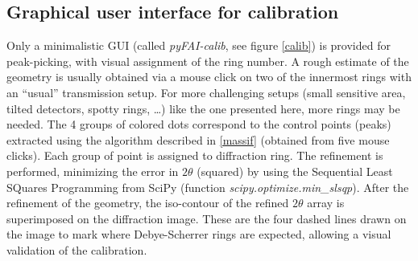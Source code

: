 \documentclass{iucr}
\begin{document}
\subsection{Graphical user interface for calibration}
\label{gui_calib}
Only a minimalistic GUI (called
\textit{pyFAI-calib}, see figure \ref{calib}) is provided
for peak-picking, with visual assignment of the ring number.
A rough estimate of the geometry is usually obtained via a mouse click on
two of the innermost rings with an ``usual'' transmission setup. 
For more challenging setups (small sensitive area, tilted detectors, spotty
rings, \ldots) like the one presented here, more rings may be needed.
The 4 groups of colored dots correspond to the control points (peaks) extracted
using the algorithm described in \ref{massif} (obtained from five mouse
clicks). Each group of point is assigned to diffraction ring.
The refinement is performed, minimizing the error in $2\theta$ (squared) by
using the Sequential Least SQuares Programming  from
SciPy (function \textit{scipy.optimize.min\_slsqp}).
After the refinement of the geometry, the iso-contour of the refined $2\theta$ array is
superimposed on the diffraction image.
These are the four dashed lines
drawn on the image to mark where Debye-Scherrer rings are expected, allowing a visual
validation of the calibration.
\end{document}
